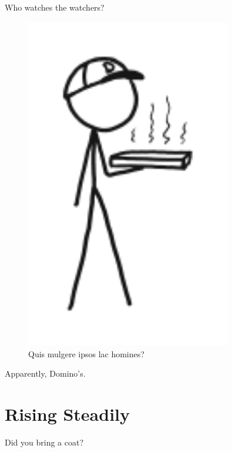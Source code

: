 {{Who watches the watchers?}

\begin{figure}[!htbp]
\centering
\includegraphics[scale=0.5, max width=0.8\textwidth]{imgs/a/63/google_watchers.png}
\caption{Quis mulgere ipsos lac homines?}
\end{figure}

{Apparently, Domino's.}

{
\chapter{Rising Steadily}
}

\hfill{}

{Did you bring a coat?}

}
